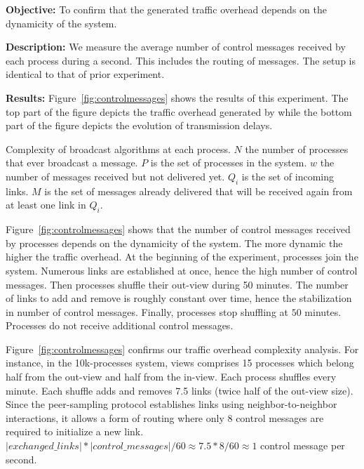 \noindent \textbf{Objective:} To confirm that the generated traffic overhead
depends on the dynamicity of the system.

\noindent \textbf{Description:} We measure the average number of control
messages received by each process during a second. This includes the routing of
messages. The setup is identical to that of prior experiment.

\noindent \textbf{Results:} Figure~\ref{fig:controlmessages} shows the results of
this experiment. The top part of the figure depicts the traffic overhead
generated by \RPCBROADCAST while the bottom part of the figure depicts the
evolution of transmission delays.

\begin{table}
  \begin{center}
    \caption{\label{table:complexity} Complexity of broadcast algorithms at each
      process. $N$ the number of processes that ever broadcast a message. $P$ is
      the set of processes in the system. $w$ the number of messages received
      but not delivered yet. $Q_i$ is the set of incoming links. $M$ is the
      set of messages already delivered that will be received again from at
      least one link in $Q_i$.}
  
  \end{center}
\end{table}



\noindent Figure~\ref{fig:controlmessages} shows that the number of control
messages received by processes depends on the dynamicity of the system. The more
dynamic the higher the traffic overhead. At the beginning of the experiment,
processes join the system. Numerous links are established at once, hence the
high number of control messages. Then processes shuffle their out-view during 50
minutes. The number of links to add and remove is roughly constant over time,
hence the stabilization in number of control messages. Finally, processes stop
shuffling at $50$ minutes. Processes do not receive additional control messages.

\noindent Figure~\ref{fig:controlmessages} confirms our traffic overhead
complexity analysis. For instance, in the 10k-processes system, views comprises
15 processes which belong half from the out-view and half from the in-view.
Each process shuffles every minute. Each shuffle adds and removes 7.5 links
(twice half of the out-view size). Since the peer-sampling protocol establishes
links using neighbor-to-neighbor interactions, it allows a form of routing where
only 8 control messages are required to initialize a new link.
$|exchanged\_links|*|control\_messages|/60 \approx 7.5*8/60 \approx 1$ control
message per second.

